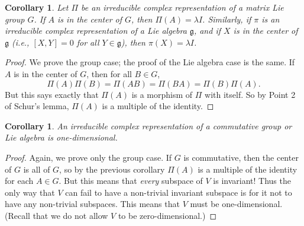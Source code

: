 \documentclass{amsbook}
\let \frak = \mathfrak
\theoremstyle{plain}
\newtheorem{corollary}[theorem]{Corollary}
\numberwithin{equation}{chapter}
\numberwithin{theorem}{chapter}
\begin{document}
\begin{corollary}
\label{schur.center}Let $\Pi$ be an irreducible complex representation of a
matrix Lie group $G$. If $A$ is in the center of $G$, then $\Pi(A)=\lambda I$.
Similarly, if $\pi$ is an irreducible complex representation of a Lie algebra
$\frak{g}$, and if $X$ is in the center of $\frak{g}$ (i.e., $[X,Y]=0$ for all
$Y\in\frak{g}$), then $\pi(X)=\lambda I$.
\end{corollary}

\begin{proof}
We prove the group case; the proof of the Lie algebra case is the same. If $A$
is in the center of $G$, then for all $B\in G$,
\[
\Pi(A)\Pi(B)=\Pi(AB)=\Pi(BA)=\Pi(B)\Pi(A)\text{.}%
\]
But this says exactly that $\Pi(A)$ is a morphism of $\Pi$ with itself. So by
Point 2 of Schur's lemma, $\Pi(A)$ is a multiple of the identity.
\end{proof}

\begin{corollary}
\label{schur.commute}An irreducible complex representation of a
\textit{commutative} group or Lie algebra is one-dimensional.
\end{corollary}

\begin{proof}
Again, we prove only the group case. If $G$ is commutative, then the center of
$G$ is all of $G$, so by the previous corollary $\Pi(A)$ is a multiple of the
identity for each $A\in G$. But this means that \textit{every} subspace of $V$
is invariant! Thus the only way that $V$ can fail to have a non-trivial
invariant subspace is for it not to have any non-trivial subspaces. This means
that $V$ must be one-dimensional. (Recall that we do not allow $V$ to be zero-dimensional.)
\end{proof}
\end{document}
